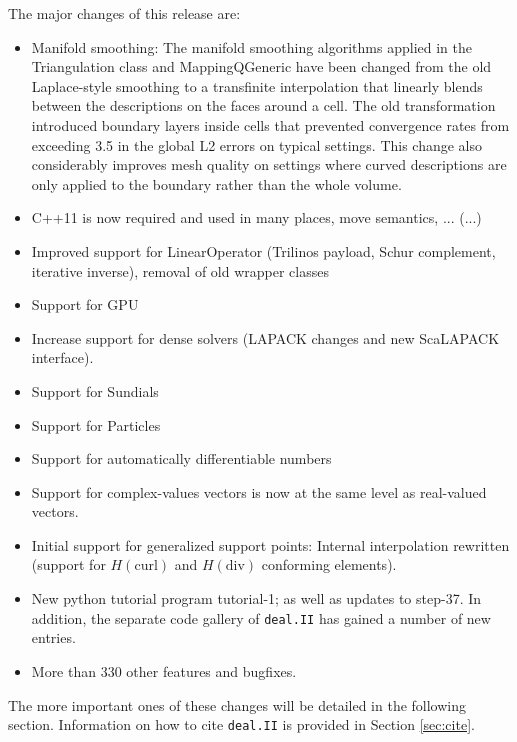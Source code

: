 \documentclass{ansarticle-preprint}
\newcommand{\specialword}[1]{\texttt{#1}}
\newcommand{\dealii}{{\specialword{deal.II}}}
\begin{document}
The major changes of this release are:
\begin{itemize}
\item
  Manifold smoothing: The manifold smoothing algorithms applied in the
  Triangulation class and MappingQGeneric have been changed from the old
  Laplace-style smoothing to a transfinite interpolation that linearly
  blends between the descriptions on the faces around a cell. The old
  transformation introduced boundary layers inside cells that prevented
  convergence rates from exceeding 3.5 in the global L2 errors on typical
  settings. This change also considerably improves mesh quality on settings
  where curved descriptions are only applied to the boundary rather than
  the whole volume.

\item
  C++11 is now required and used in many places, move semantics, ... (...)

\item
  Improved support for LinearOperator (Trilinos payload, Schur complement,
  iterative inverse), removal of old wrapper classes

\item 
  Support for GPU

\item
  Increase support for dense solvers (LAPACK changes and new ScaLAPACK
  interface).

\item
  Support for Sundials

\item 
  Support for Particles

\item 
  Support for automatically differentiable numbers

\item 
  Support for complex-values vectors is now at the same level as real-valued
  vectors.

\item
  Initial support for generalized support points: Internal interpolation
  rewritten (support for $H(\text{curl})$ and $H(\text{div})$ conforming
  elements).

\item New python tutorial program tutorial-1; as well as
  updates to step-37. In addition, the separate code
  gallery of \dealii{} has gained a number of new entries.

  \item More than 330 other features and bugfixes.
\end{itemize}
The more important ones of these changes will be detailed in the
following section.  Information on how to cite \dealii{} is provided
in Section \ref{sec:cite}.
\end{document}
